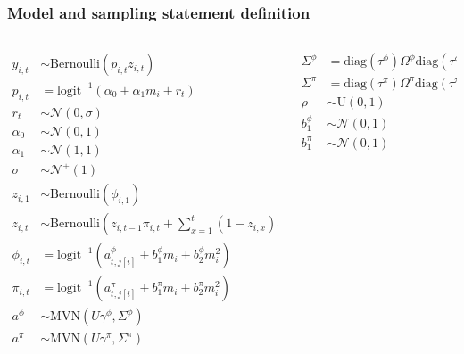 \documentclass{beamer}
\begin{document}
\begin{frame}
  \frametitle{Model and sampling statement definition}
  \begin{center}
    \begin{scriptsize}
      \begin{columns}
        \begin{column}{0.5\textwidth}
          \begin{align*}
            y_{i, t} &\sim \text{Bernoulli}(p_{i, t} z_{i, t}) \\
            p_{i, t} &= \text{logit}^{-1}(\alpha_{0} + \alpha_{1} m_{i} + r_{t}) \\ 
            r_{t} &\sim \mathcal{N}(0, \sigma) \\
            \alpha_{0} &\sim \mathcal{N}(0, 1) \\
            \alpha_{1} &\sim \mathcal{N}(1, 1) \\
            \sigma &\sim \mathcal{N}^{+}(1) \\
            z_{i, 1} &\sim \text{Bernoulli}(\phi_{i, 1}) \\
            z_{i, t} &\sim \text{Bernoulli}\left(z_{i, t - 1} \pi_{i,t} + \sum_{x = 1}^{t}(1 - z_{i, x}) \phi_{i,t}\right) \\
            \phi_{i, t} &= \text{logit}^{-1}(a^{\phi}_{t, j[i]} + b^{\phi}_{1} m_{i} + b^{\phi}_{2} m_{i}^{2}) \\
            \pi_{i, t} &= \text{logit}^{-1}(a^{\pi}_{t, j[i]} + b^{\pi}_{1} m_{i} + b^{\pi}_{2} m_{i}^{2}) \\
            a^{\phi} &\sim \text{MVN}(U \gamma^{\phi}, \Sigma^{\phi}) \\
            a^{\pi} &\sim \text{MVN}(U \gamma^{\pi}, \Sigma^{\pi}) \\
          \end{align*}
        \end{column}
        \begin{column}{0.5\textwidth}
          \begin{align*}
            \Sigma^{\phi} &= \text{diag}(\tau^{\phi}) \Omega^{\phi} \text{diag}(\tau^{\phi}) \\
            \Sigma^{\pi} &= \text{diag}(\tau^{\pi}) \Omega^{\pi} \text{diag}(\tau^{\pi}) \\
            \rho &\sim \text{U}(0, 1) \\
            b^{\phi}_{1} &\sim \mathcal{N}(0, 1) \\
            b^{\pi}_{1} &\sim \mathcal{N}(0, 1) \\

\end{align*}
\end{column}
\end{columns}
\end{scriptsize}
\end{center}
\end{frame}
\end{document}
